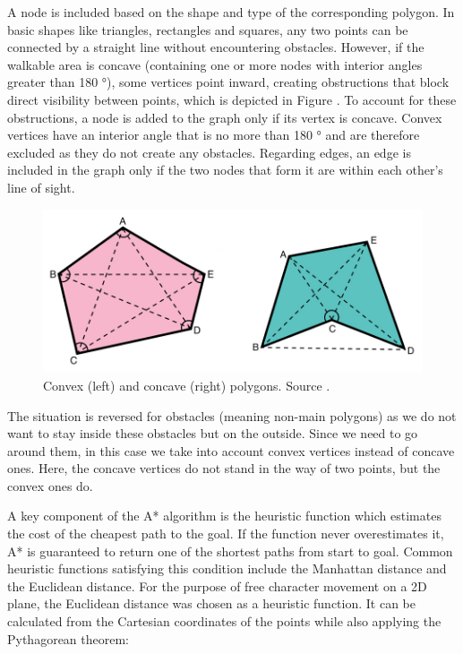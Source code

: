 A node is included based on the shape and type of the corresponding polygon. In basic shapes like triangles, rectangles and squares, any two points can be connected by a straight line without encountering obstacles. However, if the walkable area is concave (containing one or more nodes with interior angles greater than 180 °), some vertices point inward, creating obstructions that block direct visibility between points, which is depicted in Figure \cite{Polygons}. To account for these obstructions, a node is added to the graph only if its vertex is concave. Convex vertices have an interior angle that is no more than 180 ° and are therefore excluded as they do not create any obstacles. Regarding edges, an edge is included in the graph only if the two nodes that form it are within each other’s line of sight.


\begin{figure}[H]
\centering
\includegraphics[width=.8\linewidth]{img/polygons.png}
\caption{Convex (left) and concave (right) polygons. Source \cite{Polygons}.}
\label{fig:Polygons}
\end{figure}


The situation is reversed for obstacles (meaning non-main polygons) as we do not want to stay inside these obstacles but on the outside. Since we need to go around them, in this case we take into account convex vertices instead of concave ones. Here, the concave vertices do not stand in the way of two points, but the convex ones do. 

A key component of the A* algorithm is the heuristic function which estimates the cost of the cheapest path to the goal. If the function never overestimates it, A* is guaranteed to return one of the shortest paths from start to goal. Common heuristic functions satisfying this condition include the Manhattan distance and the Euclidean distance. For the purpose of free character movement on a 2D plane, the Euclidean distance was chosen as a heuristic function. It can be calculated from the Cartesian coordinates of the points while also applying the Pythagorean theorem:

